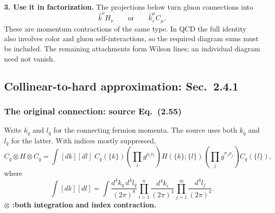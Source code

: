 \documentclass[14pt,a4paper]{extarticle}
\numberwithin{equation}{section}
\begin{document}
\textbf{3. Use it in factorization.}
The projections below turn gluon connections into
\begin{equation}
 \hat k^\nu H_\nu
 \qquad\text{or}\qquad
 \hat k_s^\mu C_\mu.
\end{equation}
These are momentum contractions of the same type. In QCD the full
identity also involves color and gluon self-interactions, so the required
diagram sums must be included. The remaining attachments form Wilson
lines; an individual diagram need not vanish.

\subsection{Collinear-to-hard approximation: Sec.~2.4.1}
\label{sec:notes-collinear-hard}
\subsubsection{The original connection: source Eq.~(2.55)}
Write $k_q$ and $l_{\bar q}$ for the connecting fermion momenta.
The source uses both $k_{\bar q}$ and $l_{\bar q}$ for the latter.
With indices mostly suppressed,
\begin{equation}
 C_q\otimes H\otimes C_{\bar q}
 =\int[d k][d l]\;C_q(\{k\})
 \left(\prod_i g^{\mu_i\nu_i}\right)H(\{k\};\{l\})
 \left(\prod_jg^{\sigma_j\rho_j}\right)C_{\bar q}(\{l\}),
\end{equation}
where
\begin{equation}
 \int[d k][d l]=\int\frac{d^4k_q\,d^4l_{\bar q}}{(2\pi)^8}
 \prod_{i=1}^{n}\frac{d^4k_i}{(2\pi)^4}
 \prod_{j=1}^{m}\frac{d^4l_j}{(2\pi)^4}.
\end{equation}
\textbf{$\otimes$ :both integration and index contraction.}
\end{document}
